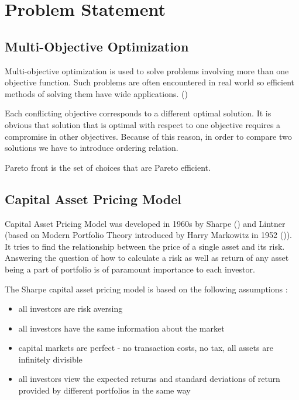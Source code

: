 \chapter{Problem Statement}
\label{cha:multiObjectiveOptimization}




\section{Multi-Objective Optimization}
\label{sec:strukturaDokumentu}

Multi-objective optimization is used to solve problems involving more than one objective function.
Such problems are often encountered in real world so efficient methods of solving them have wide applications.
(\cite{Deb:2001:MOU:559152})


Each conflicting objective corresponds to a different optimal solution.  
It is obvious that solution that is optimal with respect to one objective requires a compromise in other objectives.
Because of this reason, in order to compare two solutions we have to introduce ordering relation.

Pareto front is the set of choices that are Pareto efficient. 



\section{Capital Asset Pricing Model}
\label{CAPM}


Capital Asset Pricing Model was developed in 1960s by Sharpe (\cite{CAPM-Sharpe}) and Lintner (based on Modern Portfolio Theory introduced by Harry Markowitz in 1952 (\cite{MPT})).
It tries to find the relationship between the price of a single asset and its risk.
Answering the question of how to calculate a risk as well as return of any asset being a part of portfolio is of paramount importance to each investor.

The Sharpe capital asset pricing model is based on the following assumptions \cite{CAPM}:

\begin{itemize}
  \item all investors are risk aversing
  \item all investors have the same information about the market
  \item capital markets are perfect - no transaction costs, no tax, all assets are infinitely divisible
  \item all investors view the expected returns and standard deviations of return provided by different portfolios in the same way
\end{itemize}
 

